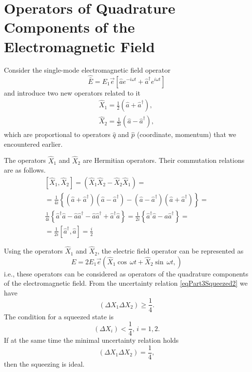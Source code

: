 \section{Operators of Quadrature Components of the Electromagnetic Field}
Consider the single-mode electromagnetic field operator 
\begin{equation}
\hat{\bar{E}} = 
E_1 \vec{e}\left[
\hat{a} e^{-i\omega t} +
\hat{a}^{\dag} e^{i\omega t}
\right]
\nonumber
\end{equation}
and introduce two new operators related to it
\begin{eqnarray}
\hat{X}_1 = \frac{1}{2}\left(\hat{a} + \hat{a}^{\dag}\right),
\nonumber \\
\hat{X}_2 = \frac{1}{2i}\left(\hat{a} - \hat{a}^{\dag}\right),
\nonumber
\end{eqnarray}
which are proportional to operators $\hat{q}$ and $\hat{p}$ (coordinate,
momentum) that we encountered earlier.

The operators $\hat{X}_1$ and $\hat{X}_2$ are Hermitian
operators. Their commutation relations are as follows.
\begin{eqnarray}
\left[\hat{X}_1, \hat{X}_2\right] = 
\left(\hat{X}_1 \hat{X}_2 - \hat{X}_2 \hat{X}_1 \right) = 
\nonumber \\
=
\frac{1}{4i}
\left\{
\left(\hat{a} + \hat{a}^{\dag}\right)
\left(\hat{a} - \hat{a}^{\dag}\right)
-
\left(\hat{a} - \hat{a}^{\dag}\right)
\left(\hat{a} + \hat{a}^{\dag}\right)
\right\} = 
\nonumber \\
\frac{1}{4i}
\left\{
\hat{a}^{\dag}\hat{a}
- \hat{a}\hat{a}^{\dag}
- \hat{a}\hat{a}^{\dag}
+
\hat{a}^{\dag}\hat{a}
\right\} = 
\frac{1}{2i}
\left\{
\hat{a}^{\dag}\hat{a}
- \hat{a}\hat{a}^{\dag}
\right\} =
\nonumber \\
= 
\frac{1}{2i}
\left[\hat{a}^{\dag}, \hat{a}\right] = 
\frac{i}{2}
\nonumber
\end{eqnarray}

Using the operators $\hat{X}_1$ and $\hat{X}_2$, the electric field operator can be represented as
\begin{equation}
E = 2 E_1 \vec{e}\left(
\hat{X}_1 \cos \, \omega t +
\hat{X}_2 \sin \, \omega t,
\right)
\nonumber
\end{equation}
i.e., these operators can be considered as operators of the quadrature
components of the electromagnetic field. From the uncertainty relation
\eqref{eqPart3Squeezed2} we have
\begin{equation}
\left(
\Delta X_1 \Delta X_2
\right) \ge \frac{1}{4}.
\nonumber
\end{equation}
The condition for a squeezed state is
\begin{equation}
\left(
\Delta X_i 
\right) < \frac{1}{4}, \, i = 1,2.
\nonumber
\end{equation}
If at the same time the minimal uncertainty relation holds
\begin{equation}
\left(
\Delta X_1 \Delta X_2
\right) = \frac{1}{4},
\nonumber
\end{equation}
then the squeezing is ideal.

